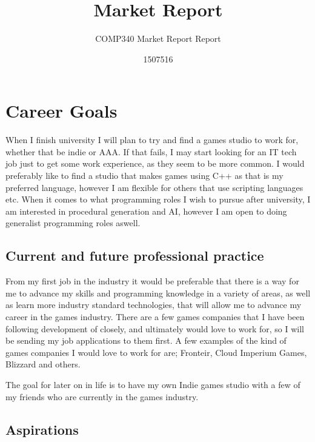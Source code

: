 \documentclass{scrartcl}
\title{Market Report}
\subtitle{COMP340 Market Report Report}
\author{1507516}
\begin{document}
\maketitle


\section{Career Goals}

When I finish university I will plan to try and find a games studio to work for, whether that be indie or AAA. If that fails, I may start looking for an IT tech job just to get some work experience, as they seem to be more common.
I would preferably like to find a studio that makes games using C++ as that is my preferred language, however I am flexible for others that use scripting languages etc.
When it comes to what programming roles I wish to pursue after university, I am interested in procedural generation and AI, however I am open to doing generalist programming roles aswell.


\subsection{Current and future professional practice}
From my first job in the industry it would be preferable that there is a way for me to advance my skills and programming knowledge in a variety of areas, as well as learn more industry standard technologies, that will allow me to advance my career in the games industry. 
There are a few games companies that I have been following development of closely, and ultimately would love to work for, so I will be sending my job applications to them first.
A few examples of the kind of games companies I would love to work for are; Fronteir, Cloud Imperium Games, Blizzard and others.

The goal for later on in life is to have my own Indie games studio with a few of my friends who are currently in the games industry.

\subsection{Aspirations} 
\end{document}
